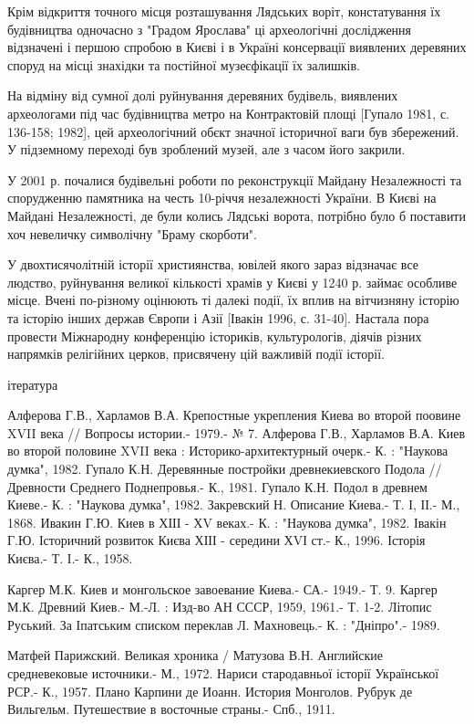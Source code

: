 Крім відкриття точного місця розташування Лядських воріт, констатування їх
будівництва одночасно з "Градом Ярослава" ці археологічні дослідження
відзначені і першою спробою в Києві і в Україні консервації виявлених деревяних
споруд на місці знахідки та постійної музеєфікації їх залишків.

На відміну від сумної долі руйнування деревяних будівель, виявлених
археологами під час будівництва метро на Контрактовій площі [Гупало 1981, с.
136-158; 1982], цей археологічний обєкт значної історичної ваги був
збережений. У підземному переході був зроблений музей, але з часом його
закрили.

У 2001 р. почалися будівельні роботи по реконструкції Майдану Незалежності та
спорудженню памятника на честь 10-річчя незалежності України. В Києві на
Майдані Незалежності, де були колись Лядські ворота, потрібно було б поставити
хоч невеличку символічну "Браму скорботи".

У двохтисячолітній історії християнства, ювілей якого зараз відзначає все
людство, руйнування великої кількості храмів у Києві у 1240 р. займає особливе
місце. Вчені по-різному оцінюють ті далекі події, їх вплив на вітчизняну
історію та історію інших держав Європи і Азії [Івакін 1996, с. 31-40]. Настала
пора провести Міжнародну конференцію істориків, культурологів, діячів різних
напрямків релігійних церков, присвячену цій важливій події історії.

ітература

Алферова Г.В., Харламов В.А. Крепостные укрепления Киева во второй поовине XVII века // Вопросы истории.- 1979.- № 7.
Алферова Г.В., Харламов В.А. Киев во второй половине XVII века : Историко-архитектурный очерк.- К. : "Наукова думка", 1982.
Гупало К.Н. Деревянные постройки древнекиевского Подола // Древности Среднего Поднепровья.- К., 1981.
Гупало К.Н. Подол в древнем Киеве.- К. : "Наукова думка", 1982.
Закревский Н. Описание Киева.- Т. І, ІІ.- М., 1868.
Ивакин Г.Ю. Киев в ХІІІ - ХV веках.- К. : "Наукова думка", 1982.
Івакін Г.Ю. Історичний розвиток Києва ХІІІ - середини ХVІ ст.- К., 1996.
Історія Києва.- Т. І.- К., 1958.

Каргер М.К. Киев и монгольское завоевание Киева.- СА.- 1949.- Т. 9.
Каргер М.К. Древний Киев.- М.-Л. : Изд-во АН СССР, 1959, 1961.- Т. 1-2.
Літопис Руський. За Іпатським списком переклав Л. Махновець.- К. : "Дніпро".- 1989.

Матфей Парижский. Великая хроника / Матузова В.Н. Английские средневековые источники.- М., 1972.
Нариси стародавньої історії Української РСР.- К., 1957.
Плано Карпини де Иоанн. История Монголов. Рубрук де Вильгельм. Путешествие в восточные страны.- Спб., 1911.

